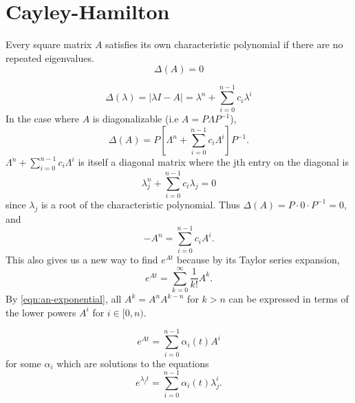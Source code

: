 \section{Cayley-Hamilton}\label{appendix:cayley}
\begin{theorem}
  Every square matrix $A$ satisfies its own characteristic polynomial if there are no repeated eigenvalues.
  \[
	\Delta(A) = 0
  \]
  \label{thm:cayley-hamilton}
\end{theorem}
\[
  \Delta(\lambda) = |\lambda I - A| = \lambda^n + \sum_{i=0}^{n-1} c_i \lambda^i
\]
In the case where $A$ is diagonalizable (i.e $A = P\Lambda P^{-1}$),
\[
  \Delta(A) = P\left[ \Lambda^n + \sum_{i=0}^{n-1}c_i \Lambda^i \right]P^{-1}.
\]
$\Lambda^n + \sum_{i=0}^{n-1}c_i \Lambda^i$ is itself a diagonal matrix where the jth entry on the diagonal is
\[
  \lambda_j^n + \sum_{i=0}^{n-1}c_i\lambda_j = 0
\]
since $\lambda_j$ is a root of the characteristic polynomial.
Thus $\Delta(A) = P \cdot 0 \cdot P^{-1} = 0$, and
\begin{equation}
  -A^n = \sum_{i=0}^{n-1}c_iA^i.
  \label{eqn:an-exponential}
\end{equation}
This also gives us a new way to find $e^{At}$ because by its Taylor series expansion,
\[
  e^{At} = \sum_{k=0}^{\infty} \frac{1}{k!}A^k.
\]
By \cref{eqn:an-exponential}, all $A^k = A^{n}A^{k-n}$ for $k>n$ can be expressed in terms of the lower powers $A^i$ for $i\in[0, n)$.
\begin{theorem}
  \[
	e^{At} = \sum_{i=0}^{n-1}\alpha_i(t)A^i
  \] for some $\alpha_i$ which are solutions to the equations
  \[
	e^{\lambda_jt} = \sum_{i=0}^{n-1}\alpha_i(t)\lambda_j^i.
  \]
  \label{thm:matrix-exponential}
\end{theorem}


